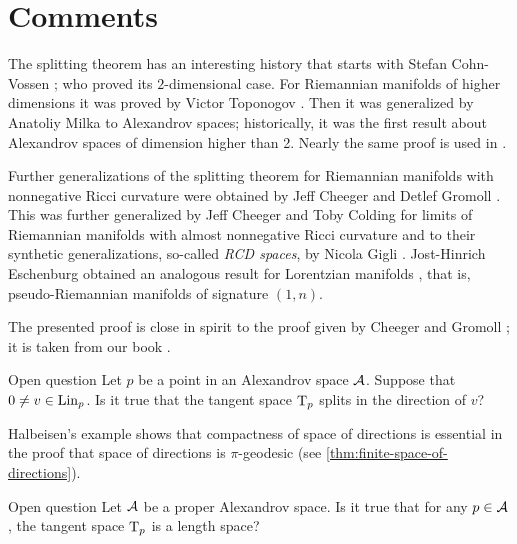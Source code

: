 \section{Comments}

The splitting theorem has an interesting history that starts with Stefan Cohn-Vossen \cite{cohn-vossen_line};
who proved its $2$-dimensional case.
For Riemannian manifolds of higher dimensions 
it was proved by Victor Toponogov \cite{toponogov-globalization+splitting}.
Then it was generalized by Anatoliy Milka \cite{milka-line}
to Alexandrov spaces;
historically, it was the first result about Alexandrov spaces of dimension higher than 2.
Nearly the same proof is used in \cite[1.5]{burago-burago-ivanov}.

Further generalizations of the splitting theorem for Riemannian manifolds with nonnegative Ricci curvature were obtained by Jeff Cheeger and Detlef Gromoll \cite{cheeger-gromoll-split}.
This was further generalized by Jeff Cheeger and Toby Colding for limits of Riemannian manifolds with almost nonnegative Ricci curvature \cite{cheeger-colding-alm-rigidity} and to their synthetic generalizations, so-called {}\emph{RCD spaces}, by Nicola Gigli \cite{gigli2013splitting, gigli-splitting-overview}.
Jost-Hinrich Eschenburg obtained an analogous result for Lorentzian manifolds \cite{eshenburg-split}, that is, pseudo-Riemannian manifolds of signature $(1,n)$.

The presented proof is close in spirit to the proof given by Cheeger and Gromoll \cite{cheeger-gromoll-split};
it is taken from our book \cite{alexander-kapovitch-petrunin2024}.

\begin{thm}{Open question}
Let $p$ be a point in an Alexandrov space $\mathcal{A}$.
Suppose that $0\ne v\in \mathop{\rm Lin}\nolimits_p$.
Is it true that the tangent space $\mathrm{T}_p$ splits in the direction of $v$?
\end{thm}

Halbeisen's example \cite{alexander-kapovitch-petrunin2024,halbeisen} shows that compactness of space of directions is essential in the proof that space of directions is $\pi$-geodesic (see \ref{thm:finite-space-of-directions}).

\begin{thm}{Open question}\label{open:Halb-proper}
Let $\mathcal{A}$ be a proper Alexandrov space.
Is it true that for any $p\in \mathcal{A}$, the tangent space $\mathrm{T}_p$ is a length space?
\end{thm}


